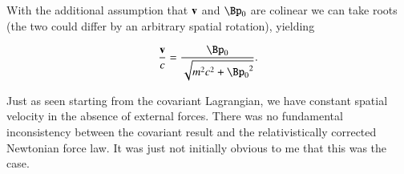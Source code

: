 With the additional assumption that $\mathbf{v}$ and $\Bp_0$ are colinear we can take roots (the two could differ by an arbitrary spatial rotation), yielding

\begin{align}\label{eqn:constFourMomentum:qqq14}
\frac{\Bv}{c} = \frac{ \Bp_0} { \sqrt{m^2 c^2 + {\Bp_0}^2} }.
\end{align}

Just as seen starting from the covariant Lagrangian, we have constant spatial velocity in the absence of external forces.  There was no fundamental inconsistency between the covariant result and the relativistically corrected Newtonian force law.  It was just not initially obvious to me that this was the case.

\EndNoBibArticle
